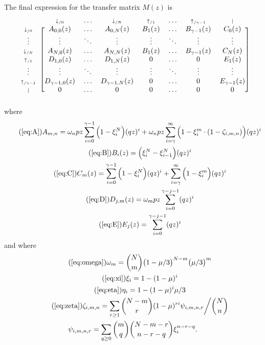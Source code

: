 \documentclass{article}
\newcommand{\dn}[1]{\scriptstyle{\downarrow_{/#1}}}
\newcommand{\up}[1]{\scriptstyle{\uparrow_{/#1}}}
\newcommand{\nd}{\scriptstyle{|}}
\begin{document}
The final expression for the transfer matrix $M(z)$ is
\begin{equation*}
\begin{blockarray}{cccccccc}
   & \dn{0} & \ldots & \dn{N} & \up{1} & \ldots & \up{\gamma-1} & \nd \\
\begin{block}{c[ccccccc]}
\dn{0} & A_{0,0}(z) & \ldots & A_{0,N}(z) & B_1(z) & \ldots &
    B_{\gamma-1}(z) & C_0(z) \\
\vdots & \vdots & \ddots & \vdots & \vdots & \ddots &
    \vdots & \vdots \\
\dn{N} & A_{N,0}(z) & \ldots & A_{N,N}(z) & B_1(z) & \ldots &
    B_{\gamma-1}(z) & C_N(z) \\
\up{1} & D_{1,0}(z) & \ldots & D_{1,N}(z) & 0 & \ldots & 0 & E_1(z) \\
\vdots & \vdots & \ddots & \vdots & \vdots & \ddots &
    \vdots & \vdots \\
\up{\gamma-1} & D_{\gamma-1,0}(z) & \ldots & D_{\gamma-1,N}(z) & 0 &
  \ldots & 0 & E_{\gamma-1}(z) \\
\nd & 0 & \ldots & 0 & 0 & \ldots & 0 & 0 \\
\end{block}
\end{blockarray}
\end{equation*}
where
\begin{gather}
\tag{\ref{eq:A}}
A_{m,n} =
\omega_n pz \sum_{i=0}^{\gamma-1} \Big(1 - \xi_i^N \Big) (qz)^i + \omega_n
pz \sum_{i=\gamma}^\infty \Big(1 - \xi_i^m \cdot
(1- \zeta_{i,m,n}) \Big) (qz)^i \\
\tag{\ref{eq:B}}
B_i(z) = \Big( \xi_i^N-\xi_{i-1}^N \Big) (qz)^i \\
\tag{\ref{eq:C}}
C_m(z) =
\sum_{i=0}^{\gamma-1} \Big(1 - \xi_i^N \Big) (qz)^i +
  \sum_{i=\gamma}^\infty \Big(1 - \xi_i^m \Big) (qz)^i \\
\tag{\ref{eq:D}}
D_{j,m}(z) = \omega_m pz \sum_{i=0}^{\gamma-j-1} (qz)^i \\
\tag{\ref{eq:E}}
E_j(z) = \sum_{i=0}^{\gamma-j-1} (qz)^i
\end{gather}
and where
\begin{gather}
\tag{\ref{eq:omega}}
\omega_m = {N \choose m} \big(1 - \mu/3\big)^{N-m} \big(\mu/3\big)^m \\
\tag{\ref{eq:xi}}
\xi_i = 1-(1-\mu)^i \\
\tag{\ref{eq:eta}}
\eta_i = 1-(1-\mu)^i\mu/3 \\
\tag{\ref{eq:zeta}}
\zeta_{i,m,n} = \sum_{r\geq1} {N-m \choose r}
(1-\mu)^{ri} \psi_{i,m,n,r} \bigg/ {N \choose n} \\
\notag
\psi_{i,m,n,r} = \sum_{q \geq 0}{m \choose q}{N-m-r \choose n-r-q}
\xi_i^{n-r-q}.
\end{gather}
\end{document}
